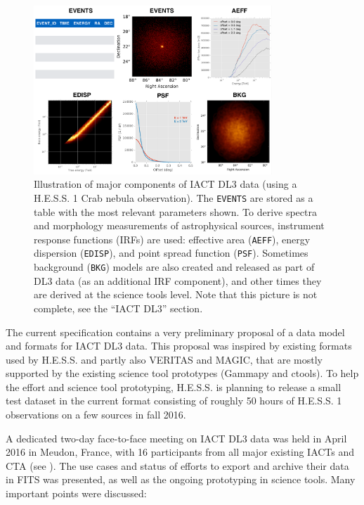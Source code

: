 \begin{figure}[tb]
\centerline{\includegraphics[width=0.8\textwidth]{figures/iact-dl3}}
\caption{
Illustration of major components of IACT DL3 data (using a H.E.S.S. 1 Crab nebula observation). The \texttt{EVENTS} are stored as a table with the most relevant parameters shown. To derive spectra and morphology measurements of astrophysical sources, instrument response functions (IRFs) are used: effective area (\texttt{AEFF}), energy dispersion (\texttt{EDISP}), and point spread function (\texttt{PSF}). Sometimes background (\texttt{BKG}) models are also created and released as part of DL3 data (as an additional IRF component), and other times they are derived at the science tools level. Note that this picture is not complete, see the ``IACT DL3'' section.
}
\label{fig:iact-dl3}
\end{figure}

The current specification contains a very preliminary proposal of a data model and formats for IACT DL3 data. This proposal was inspired by existing formats used by H.E.S.S. and partly also VERITAS and MAGIC, that are mostly supported by the existing science tool prototypes (Gammapy and ctools). To help the \gadf effort and science tool prototyping, H.E.S.S. is planning to release a small test dataset in the current format consisting of roughly 50 hours of H.E.S.S. 1 observations on a few sources in fall 2016.

A dedicated two-day face-to-face meeting on IACT DL3 data was held in April 2016 in Meudon, France, with 16 participants from all major existing IACTs and CTA (see \ogrameudon). The use cases and status of efforts to export and archive their data in FITS was presented, as well as the ongoing prototyping in science tools. Many important points were discussed:

